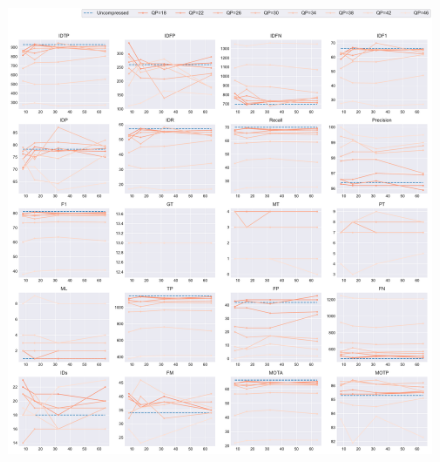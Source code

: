 \begin{figure}[!htbp]
\centering
\includegraphics[width=1.0\linewidth]{img/appendix/RaceHorsesC_all_multiplots_msr.pdf}
\caption[Result of all object classes in Class C RaceHorsesC with Horizontal Axis of MSR]{}
\label{fig:RaceHorsesC_all_msr}
\end{figure}



